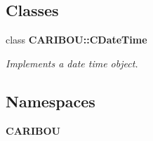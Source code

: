 \subsection*{Classes}
\begin{DoxyCompactItemize}
\item 
class {\bf C\-A\-R\-I\-B\-O\-U\-::\-C\-Date\-Time}
\begin{DoxyCompactList}\small\item\em Implements a date time object. \end{DoxyCompactList}\end{DoxyCompactItemize}
\subsection*{Namespaces}
\begin{DoxyCompactItemize}
\item 
{\bf C\-A\-R\-I\-B\-O\-U}
\end{DoxyCompactItemize}
